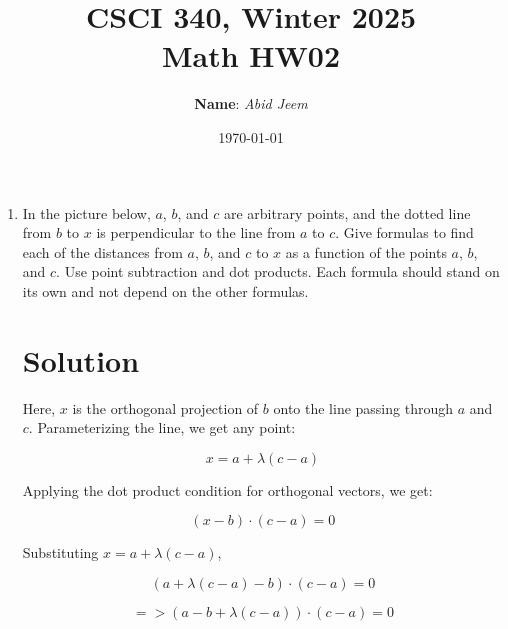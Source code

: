 \documentclass{article}
\begin{document}
\title{\bf CSCI 340, Winter 2025\\ Math HW02}
\author{\textbf{Name}: \textit{Abid Jeem}}
\date{\today}

\maketitle

\begin{enumerate}

\item
  In the picture below, $a$, $b$, and $c$ are arbitrary points, and
  the dotted line from $b$ to $x$ is perpendicular to the line from
  $a$ to $c$. Give formulas to find each of the
  distances from 
  $a$, $b$, and $c$ to $x$ as a function of the points $a$, $b$, and $c$.
  Use point subtraction and dot products. Each formula should stand
  on its own and not depend on the other formulas.

\newcommand{\mypoint}[3] {
  \node (#1) at (#2) {};
  \fill (#2) circle (2pt);
  \node[anchor=#3] (label#1) at (#2) {$#1$};
  }

 \bigskip
  
 \section*{Solution}

Here, \(x\) is the orthogonal projection of \(b\) onto the line passing through \(a\) and \(c\). Parameterizing the line, we get any point:

\begin{equation}
x = a + \lambda (c - a)
\label{eq:x_param}
\end{equation}


Applying the dot product condition for orthogonal vectors, we get:

\[
(x - b) \cdot (c - a) = 0
\]

\vspace{0.5cm}

Substituting \(x = a + \lambda (c - a)\),

\[
(a + \lambda (c - a) - b) \cdot (c - a) = 0
\]

\[
=> (a - b + \lambda (c - a)) \cdot (c - a) = 0
\]


\end{enumerate}
\end{document}
